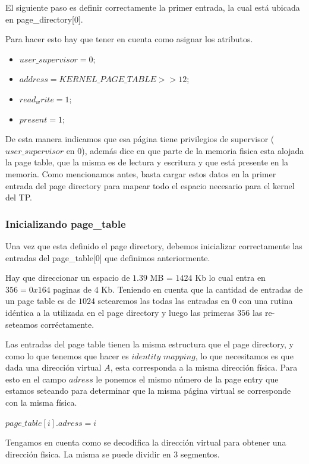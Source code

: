 \documentclass[a4paper,10pt,twoside]{article}
\begin{document}
El siguiente paso es definir correctamente la primer entrada, la cual está ubicada en page\_directory[0].

Para hacer esto hay que tener en cuenta como asignar los atributos. 

\begin{itemize}
 \item $user\_supervisor = 0$;
 \item $address = KERNEL\_PAGE\_TABLE >> 12$;
 \item $read_write = 1$;
 \item $present = 1$;
\end{itemize}

De esta manera indicamos que esa página tiene privilegios de supervisor ($user\_supervisor$ en 0), además dice en que parte de la memoria fisica esta alojada la page table, que la misma es de lectura y escritura y que está presente en la memoria.
Como mencionamos antes, basta cargar estos datos en la primer entrada del page directory para mapear todo el espacio necesario para el kernel del TP.

\subsubsection{Inicializando page\_table}
Una vez que esta definido el page directory, debemos inicializar correctamente las entradas del page\_table[0] que definimos anteriormente.

Hay que direccionar un espacio de $1.39$ MB =  $1424$ Kb lo cual entra en $356 = 0x164$ paginas de $4$ Kb. Teniendo en cuenta que la cantidad de entradas de un page table es de $1024$ setearemos las todas las entradas en $0$ con una rutina idéntica a la utilizada en el page directory y luego las primeras $356$ las re-seteamos corréctamente.

Las entradas del page table tienen la misma estructura que el page directory, y como lo que tenemos que hacer es $identity$ $mapping$, lo que necesitamos es que dada una dirección virtual $A$, esta corresponda a la misma dirección física. Para esto en el campo $adress$ le ponemos el mismo número de la page entry que estamos seteando para determinar que la misma página virtual se corresponde con la misma física.

$page\_table[i].adress = i$

Tengamos en cuenta como se decodifica la dirección virtual para obtener una dirección fisica. La misma se puede dividir en $3$ segmentos.
\end{document}
